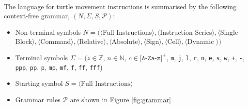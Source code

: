 \paragraph{} The language for turtle movement instructions is summarised by the following context-free grammar, $(N,\Sigma,S,\mathcal{P})$:
\begin{itemize}
	\item Non-terminal symbols $N=(\langle$Full Instructions$\rangle, \langle$Instruction Series$\rangle, \langle$Single Block$\rangle, \langle$Command$\rangle, \langle$Relative$\rangle, \langle$Absolute$\rangle, \langle$Sign$\rangle, \langle$Cell$\rangle, \langle$Dynamic $\rangle)$
	\item Terminal symbols $\Sigma=(z{\in}\mathbb{Z}$, $n{\in}\mathbb{N}$, $c{\in}\texttt{[A-Za-z]}^{+}$, \texttt{m}, \texttt{j}, \texttt{l}, \texttt{r}, \texttt{n}, \texttt{e}, \texttt{s}, \texttt{w}, \texttt{+}, \texttt{-}, \texttt{ppp}, \texttt{pp}, \texttt{p}, \texttt{mp}, \texttt{mf}, \texttt{f}, \texttt{ff}, \texttt{fff})
	\item Starting symbol $S = \langle \text{Full Instructions} \rangle$
  \item Grammar rules $\mathcal{P}$ are shown in Figure \ref{fig:grammar}
\end{itemize}

